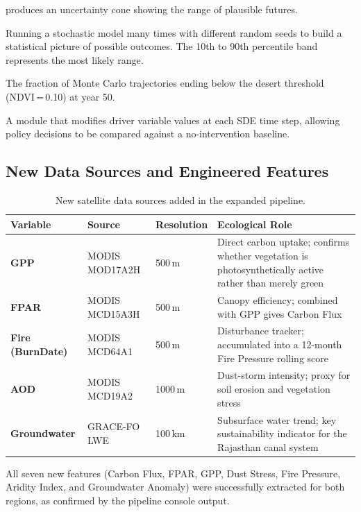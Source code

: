 \documentclass[12pt, a4paper]{article}
\begin{document}
\begin{mdframed}[style=keybox]
\begin{description}
    produces an uncertainty cone showing the range of plausible futures.
    \item[Monte Carlo] Running a stochastic model many times with
    different random seeds to build a statistical picture of possible
    outcomes. The 10th to 90th percentile band represents the most
    likely range.
    \item[Collapse Probability] The fraction of Monte Carlo trajectories
    ending below the desert threshold (NDVI\,=\,0.10) at year 50.
    \item[Intervention Engine] A module that modifies driver variable
    values at each SDE time step, allowing policy decisions to be
    compared against a no-intervention baseline.
\end{description}
\end{mdframed}

\subsection{New Data Sources and Engineered Features}

\begin{table}[H]
\centering
\caption{New satellite data sources added in the expanded pipeline.}
\label{tab:new_sources}
\begin{tabularx}{\textwidth}{>{\bfseries}p{2.6cm} p{2.8cm} p{1.8cm} X}
\toprule
Variable & Source & Resolution & Ecological Role \\
\midrule
GPP &
    MODIS MOD17A2H & 500\,m &
    Direct carbon uptake; confirms whether vegetation is
    photosynthetically active rather than merely green \\[4pt]
FPAR &
    MODIS MCD15A3H & 500\,m &
    Canopy efficiency; combined with GPP gives Carbon Flux \\[4pt]
Fire (BurnDate) &
    MODIS MCD64A1 & 500\,m &
    Disturbance tracker; accumulated into a 12-month
    Fire Pressure rolling score \\[4pt]
AOD &
    MODIS MCD19A2 & 1000\,m &
    Dust-storm intensity; proxy for soil erosion and
    vegetation stress \\[4pt]
Groundwater &
    GRACE-FO LWE & 100\,km &
    Subsurface water trend; key sustainability indicator
    for the Rajasthan canal system \\
\bottomrule
\end{tabularx}
\end{table}

All seven new features (Carbon Flux, FPAR, GPP, Dust Stress, Fire Pressure,
Aridity Index, and Groundwater Anomaly) were successfully extracted for both
regions, as confirmed by the pipeline console output.
\end{document}
